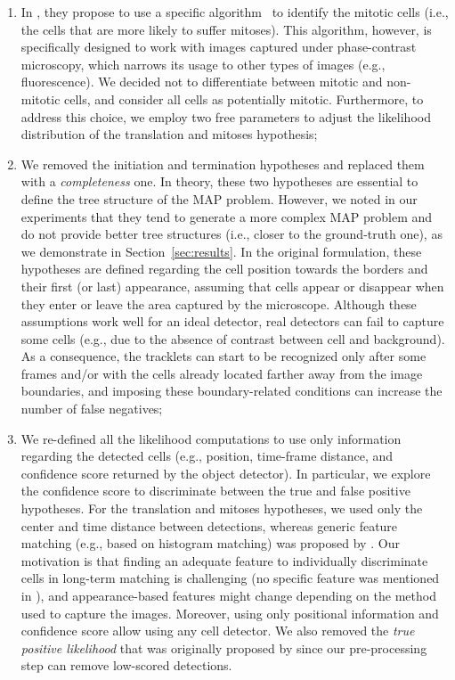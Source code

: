 \documentclass{article}
\begin{document}
\begin{enumerate}
    \item In \cite{bise}, they propose to use a specific algorithm~\cite{huh2010automated} to identify the mitotic cells (i.e., the cells that are more likely to suffer mitoses). This algorithm, however, is specifically designed to work with images captured under phase-contrast microscopy, which narrows its usage to other types of images (e.g., fluorescence). We decided not to differentiate between mitotic and non-mitotic cells, and consider all cells as potentially mitotic. Furthermore, to address this choice, we employ two free parameters to adjust the likelihood distribution of the translation and mitoses hypothesis;
    \item We removed the initiation and termination hypotheses and replaced them with a \emph{completeness} one. In theory, these two hypotheses are essential to define the tree structure of the MAP problem. However, we noted in our experiments that they tend to generate a more complex MAP problem and do not provide better tree structures (i.e., closer to the ground-truth one), as we demonstrate in Section~\ref{sec:results}. In the original formulation, these hypotheses are defined regarding the cell position towards the borders and their first (or last) appearance, assuming that cells appear or disappear when they enter or leave the area captured by the microscope. Although these assumptions work well for an ideal detector, real detectors can fail to capture some cells (e.g., due to the absence of contrast between cell and background). As a consequence,  the tracklets can start to be recognized only after some frames and/or with the cells already located farther away from the image boundaries, and imposing these boundary-related conditions can increase the number of false negatives;
    \item We re-defined all the likelihood computations to use only information regarding the detected cells (e.g., position, time-frame distance, and confidence score returned by the object detector). In particular, we explore the confidence score to discriminate between the true and false positive hypotheses. For the translation and mitoses hypotheses, we used only the center and time distance between detections, whereas generic feature matching (e.g., based on histogram matching) was proposed by \cite{bise}. Our motivation is that finding an adequate feature to individually discriminate cells in long-term matching is challenging (no specific feature was mentioned in \cite{bise}), and appearance-based features might change depending on the method used to capture the images. Moreover, using only positional information and confidence score allow using any cell detector. We also removed the \textit{true positive likelihood} that was originally proposed by \cite{bise} since our pre-processing step can remove low-scored detections.
\end{enumerate}
\end{document}
